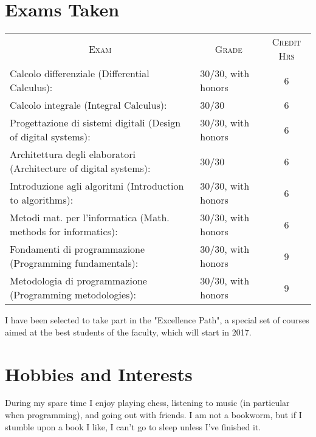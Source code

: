 \documentclass[a4paper,10pt]{article} %
\begin{document}

\bigskip
\bigskip

\section{Exams Taken}
\begin{center}
\begin{tabular}{llc}
\multicolumn{1}{c}{\textsc{Exam}} & \multicolumn{1}{c}{\textsc{Grade}} &\textsc{Credit Hrs}\\ 
Calcolo differenziale (Differential Calculus): &                              30/30, with honors & 6 \\
Calcolo integrale (Integral Calculus): &                                      30/30 & 6 \\
Progettazione di sistemi digitali (Design of digital systems): &              30/30, with honors & 6 \\
Architettura degli elaboratori (Architecture of digital systems): &           30/30 & 6 \\
Introduzione agli algoritmi (Introduction to algorithms): &                   30/30, with honors & 6 \\
Metodi mat. per l'informatica (Math. methods for informatics): &              30/30, with honors & 6 \\
Fondamenti di programmazione (Programming fundamentals): &                    30/30, with honors & 9 \\
Metodologia di programmazione (Programming metodologies): &                   30/30, with honors & 9 \\
\end{tabular}
\end{center}
I have been selected to take part in the "Excellence Path", a special set of courses aimed at the best students of the faculty, which will start in 2017.


\bigskip

\section{Hobbies and Interests}
During my spare time I enjoy playing chess, listening to music (in particular when programming), and going out with friends.
I am not a bookworm, but if I stumble upon a book I like, I can't go to sleep unless I've finished it.
\end{document}
